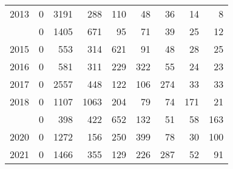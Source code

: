 \documentclass[
]{article}
\begin{document}
\begin{longtable}[t]{lrrrrrrrr}
2013 & 0 & 3191 & 288 & 110 & 48 & 36 & 14 & 8\\
\addlinespace
2014 & 0 & 1405 & 671 & 95 & 71 & 39 & 25 & 12\\
2015 & 0 & 553 & 314 & 621 & 91 & 48 & 28 & 25\\
2016 & 0 & 581 & 311 & 229 & 322 & 55 & 24 & 23\\
2017 & 0 & 2557 & 448 & 122 & 106 & 274 & 33 & 33\\
2018 & 0 & 1107 & 1063 & 204 & 79 & 74 & 171 & 21\\
\addlinespace
2019 & 0 & 398 & 422 & 652 & 132 & 51 & 58 & 163\\
2020 & 0 & 1272 & 156 & 250 & 399 & 78 & 30 & 100\\
2021 & 0 & 1466 & 355 & 129 & 226 & 287 & 52 & 91\\*
\end{longtable}
\end{document}
